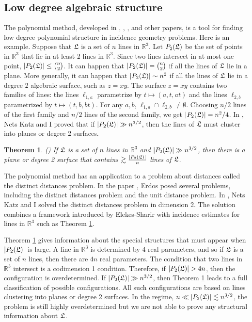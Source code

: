 \documentclass{amsart}
\newtheorem{theorem}[prop]{Theorem}
\newcommand{\RR}{\mathbb{R}}
\begin{document}
 
 \subsection{Low degree algebraic structure}
 
 The polynomial method, developed in \cite{D}, \cite{GK1}, \cite{GK2}, and other papers, is a tool for finding low degree polynomial structure in incidence geometry problems.  Here is an example.  Suppose that $\frak L$ is a set of $n$ lines in $\RR^3$.  Let $P_2(\frak L)$ be the set of points in $\RR^3$ that lie in at least 2 lines in $\RR^3$.  Since two lines intersect in at most one point, $|P_2(\frak L)| \le {n \choose 2}$.  It can happen that $|P_2(\frak L)| = {n \choose 2}$ if all the lines of $\frak L$ lie in a plane.  More generally, it can happen that $|P_2(\frak L)| \sim n^2$ if all the lines of $\frak L$ lie in a degree 2 algebraic surface, such as $z = xy$.  The surface $z= xy$ contains two families of lines: the lines $\ell_{1,a}$ parametrize by $t \mapsto (a, t, at)$ and the lines $\ell_{2,b}$ parametrized by $t \mapsto (t, b, bt)$.  For any $a,b$, $\ell_{1,a} \cap \ell_{2,b} \not= \emptyset$.  Choosing $n/2$ lines of the first family and $n/2$ lines of the second family, we get $|P_2(\frak L)| = n^2/4$.  In \cite{GK2}, Nets Katz and I proved that if $|P_2(\frak L)| \gg n^{3/2}$, then the lines of $\frak L$ must cluster into planes or degree 2 surfaces.
 
 \begin{theorem} \label{thmgk} (\cite{GK2}) If $\frak L$ is a set of $n$ lines in $\RR^3$  and $|P_2(\frak L)| \gg n^{3/2}$, then there is a plane or degree 2 surface that contains $\gtrsim \frac{ |P_2(\frak L)| }{n}$ lines of $\frak L$.
  \end{theorem}

The polynomial method has an application to a problem about distances called the distinct distances problem.  In the paper \cite{Erd}, Erdos posed several  problems,  including the distinct distances problem and the unit distance problem.  In \cite{GK2}, Nets Katz and I solved the distinct distances problem in dimension 2.  The solution combines a framework introduced by Elekes-Sharir with incidence estimates for lines in $\RR^3$ such as Theorem \ref{thmgk}.
 
Theorem \ref{thmgk} gives information about the special structures that must appear when $|P_2(\frak L)|$ is large.  A line in $\RR^3$ is determined by 4 real parameters, and so if $\frak L$ is a set of $n$ lines, then there are $4n$ real parameters.  The condition that two lines in $\RR^3$ intersect is a codimension 1 condition.  Therefore, if $|P_2(\frak L)| > 4n$, then the configuration is overdetermined.  If $|P_2(\frak L)| \gg n^{3/2}$, then Theorem \ref{thmgk} leads to a full classification of possible configurations.  All such configurations are based on lines clustering into planes or degree 2 surfaces.  In the regime, $n \ll |P_2(\frak L)| \lesssim n^{3/2}$, the problem is still highly overdetermined but we are not able to prove any structural information about $\frak L$.
\end{document}
